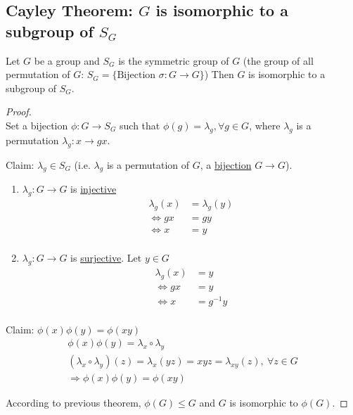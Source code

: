 \documentclass[11pt]{elegantbook}
\begin{document}
\subsection{Cayley Theorem: $G$ is isomorphic to a subgroup of $S_G$}
\begin{theorem}
Let $G$ be a group and $S_G$ is the symmetric group of $G$ (the group of all permutation of $G$: $S_G=\{\text{Bijection } \sigma: G \rightarrow G\}$)
Then $G$ is isomorphic to a subgroup of $S_G$.
\end{theorem}
\begin{proof}
\quad\\
Set a bijection $\phi: G \rightarrow S_G$ such that $\phi(g)=\lambda_g, \forall g\in G$, where $\lambda_g$ is a permutation $\lambda_g: x \rightarrow gx$.

Claim: $\lambda_g\in S_G$ (i.e. $\lambda_g$ is a permutation of $G$, a \underline{bijection} $G \rightarrow	G$).
\begin{enumerate}
    \item $\lambda_g: G \rightarrow G$ is \underline{injective}
    \begin{equation}
        \begin{aligned}
            \lambda_g(x)&=\lambda_g(y)\\
            \Leftrightarrow	gx&=gy\\
            \Leftrightarrow	x&=y\\
        \end{aligned}
        \nonumber
    \end{equation}
    \item $\lambda_g: G \rightarrow G$ is \underline{surjective}. Let $y\in G$
    \begin{equation}
        \begin{aligned}
            \lambda_g(x)&=y\\
            \Leftrightarrow	gx&=y\\
            \Leftrightarrow	x&=g^{-1}y\\
        \end{aligned}
        \nonumber
    \end{equation}
\end{enumerate}


Claim: $\phi(x)\phi(y)=\phi(xy)$
\begin{equation}
    \begin{aligned}
        \phi(x)\phi(y)=\lambda_x\circ\lambda_y\\
        (\lambda_x\circ\lambda_y)(z)=\lambda_x(yz)=xyz=\lambda_{xy}(z),\ \forall z\in G\\
        \Rightarrow	\phi(x)\phi(y)=\phi(xy)
    \end{aligned}
    \nonumber
\end{equation}

According to previous theorem, $\phi(G)\leq G$ and $G$ is isomorphic to $\phi(G)$.

\end{proof}
\end{document}
